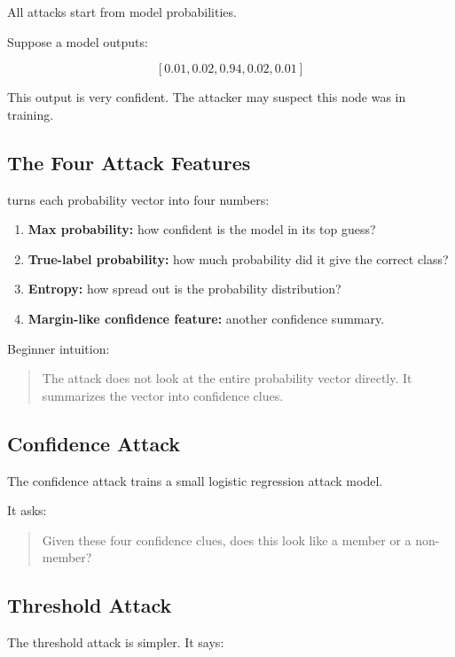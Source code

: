 \documentclass[11pt,a4paper]{article}
\newcommand{\code}[1]{\texttt{\detokenize{#1}}}
\begin{document}
All attacks start from model probabilities.

Suppose a model outputs:

\[
[0.01, 0.02, 0.94, 0.02, 0.01]
\]

This output is very confident. The attacker may suspect this node was in training.

\subsection{The Four Attack Features}

\code{extract_features} turns each probability vector into four numbers:

\begin{enumerate}
  \item \textbf{Max probability:} how confident is the model in its top guess?
  \item \textbf{True-label probability:} how much probability did it give the correct class?
  \item \textbf{Entropy:} how spread out is the probability distribution?
  \item \textbf{Margin-like confidence feature:} another confidence summary.
\end{enumerate}

Beginner intuition:

\begin{quote}
The attack does not look at the entire probability vector directly. It summarizes the vector into confidence clues.
\end{quote}

\subsection{Confidence Attack}

The confidence attack trains a small logistic regression attack model.

It asks:

\begin{quote}
Given these four confidence clues, does this look like a member or a non-member?
\end{quote}

\subsection{Threshold Attack}

The threshold attack is simpler. It says:
\end{document}
